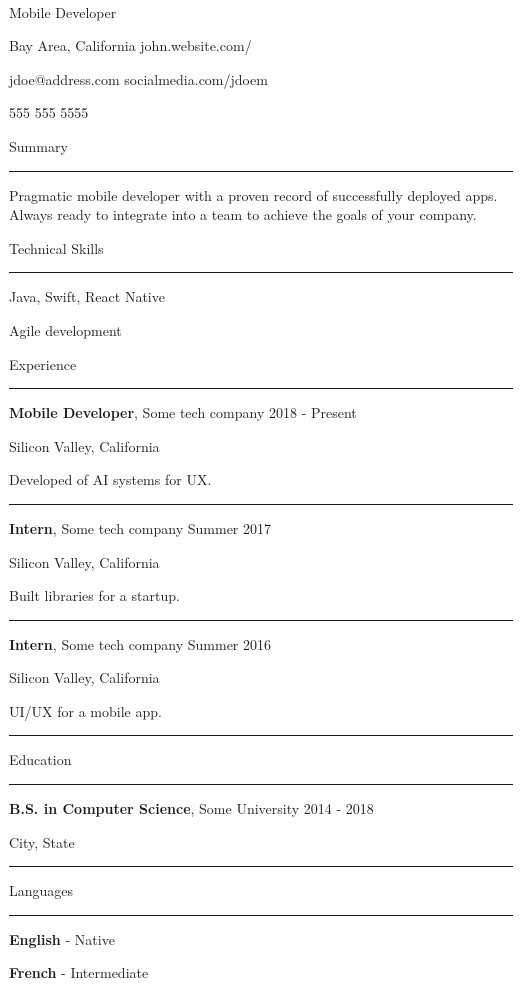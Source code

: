 \documentclass[12pt]{article}
\newcommand{\resumesection}[1]{
    {
        \color{accentcolor}
        \noindent
        \large{#1}
        \vspace{-8pt}

        \noindent
        \rule{\textwidth}{2pt}
    }
}
\newcommand{\info}[2]{
    {
        \color{secondarytext}
        \trivlist\nopagebreak
        \parindent0pt
        \item #1 \hspace{\fill} #2
        \item\relax\obeylines
    }
    \vspace{-5pt}
}
\newcommand{\job}[5]{
    \textbf{#2}, #3 \hspace{\fill} #1

    {\color{secondarytext}#4}

    #5

    \vspace{-5pt}
    {
        \color{secondaccentcolor}
        \rule{0.96\textwidth}{0.5pt}
    }

    \vspace{15pt}
}
\newcommand{\education}[4]{
    \textbf{#2}, #3 \hspace{\fill} #1

    {\color{secondarytext}#4}

    \vspace{-5pt}
    {
        \color{secondaccentcolor}
        \rule{0.96\textwidth}{0.5pt}
    }

    \vspace{15pt}
}
\newcommand{\languageprof}[2]{
    \raisebox{3pt}{$\centerdot$} \textbf{#1} - #2

    \vspace{5pt}
}
\newcommand{\closerlist}[1]{
    \raisebox{3pt}{$\centerdot$} #1

    \vspace{5pt}
}
\begin{document}
\begin{center}
     \\
    \vspace{0.25cm}
    \Large{Mobile Developer}
\end{center}

\info{Bay Area, California}{john.website.com/}
\info{jdoe@address.com}{socialmedia.com/jdoem}
\info{555 555 5555}{}

\vspace{12pt}
\resumesection{Summary}

\hangindent=15pt
Pragmatic mobile developer with a proven record of successfully deployed apps. Always ready to integrate into a team to achieve the goals of your company.

\vspace{12pt}
\resumesection{Technical Skills}

\closerlist{Java, Swift, React Native}
\closerlist{Agile development}

\vspace{8pt}
\resumesection{Experience}

\job{2018 - Present}{Mobile Developer}{Some tech company}{Silicon Valley, California}{\hangindent=15pt Developed of AI systems for UX.}

\job{Summer 2017}{Intern}{Some tech company}{Silicon Valley, California}{\hangindent=15pt Built libraries for a startup.}

\job{Summer 2016}{Intern}{Some tech company}{Silicon Valley, California}{\hangindent=15pt UI/UX for a mobile app.}

\resumesection{Education}

\education{2014 - 2018}{B.S. in Computer Science}{Some University}{City, State}

\resumesection{Languages}

\languageprof{English}{Native}
\languageprof{French}{Intermediate}
\end{document}

